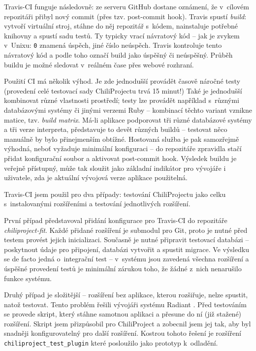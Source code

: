 \documentclass[thesis=B,czech]{FITthesis}[2012/05/02]
\begin{document}
Travis-CI funguje následovně: ze serveru GitHub dostane oznámení, že v~cílovém
repozitáři přibyl nový \gls{commit} (přes tzv. post-commit hook). Travis
spustí \emph{build}: vytvoří virtuální stroj, stáhne do něj repozitář
s~kódem, nainstaluje potřebné knihovny a spustí sadu testů. Ty typicky
vrací návratový kód -- jak je zvykem v~Unixu: \lstinline!0! znamená
úspěch, jiné číslo neúspěch. Travis kontroluje tento návratový kód a
podle toho označí build jako úspěšný či neúspěšný. Průběh buildu je
možné sledovat v~reálném čase přes webové rozhraní.

Použití \gls{CI} má několik výhod. Je zde jednodušší provádět časově
náročné testy (provedení celé testovací sady ChiliProjectu trvá 15
minut!) Také je jednodušší kombinovat různé vlastnosti
prostředí; testy lze provádět například s~různými databázovými systémy
či jinými verzemi Ruby -- kombinací těchto variant vznikne matice, tzv.
\emph{build matrix}. Má-li aplikace podporovat tři různé databázové systémy
a tři verze interpreta, představuje to devět různých buildů -- testovat
něco manuálně by bylo přinejmenším obtížné. Hostovaná služba je pak
samozřejmě výhodná, neboť vyžaduje minimální konfiguraci -- do
repozitáře zpravidla stačí přidat konfigurační soubor a aktivovat
post-commit hook. Výsledek buildu je veřejně přístupný, může tak sloužit
jako základní indikátor pro vývojáře i uživatele, zda je aktuální
vývojová verze aplikace použitelná.

Travis-CI jsem použil pro dva případy: testování ChiliProjectu jako
celku s~instalovanými rozšířeními a testování jednotlivých
rozšíření.

První případ představoval přidání konfigurace pro Travis-CI do
repozitáře \emph{chiliproject-fit}. Každé přidané rozšíření je
\gls{submodul} pro Git, proto je nutné před testem provést jejich
inicializaci. Současně je nutné připravit testovací databázi --
poskytnout údaje pro připojení, databázi vytvořit a spustit migrace. Ve
výsledku se de facto jedná o~integrační test -- v~systému jsou zavedená
všechna rozšíření a úspěšné provedení testů je minimální zárukou toho,
že žádné z~nich nenarušilo funkce systému.

Druhý případ je složitější -- rozšíření bez aplikace, kterou rozšiřuje,
nelze spustit, natož testovat. Tento problém řešili vývojáři systému
Radiant \citep{Muhl2012}. Před testováním se provede skript, který
stáhne samotnou aplikaci a přesune do ní (již stažené) rozšíření. Skript
jsem přizpůsobil pro ChiliProject a zobecnil jsem jej tak, aby byl snadněji
konfigurovatelný pro další rozšíření. Kostrou tohoto řešení je rozšíření
\lstinline!chiliproject_test_plugin! které posloužilo jako prototyp
k~odladění.
\end{document}
